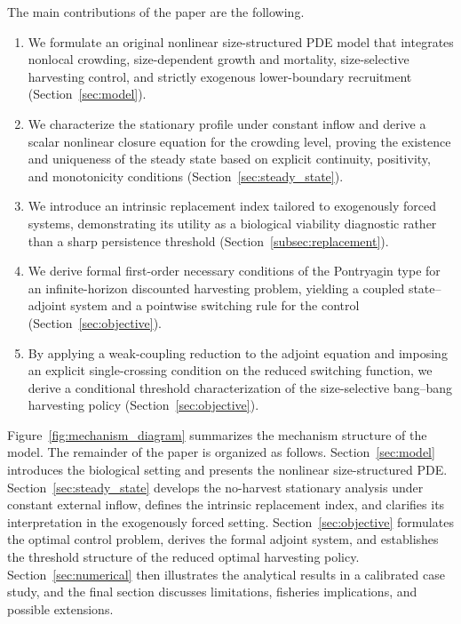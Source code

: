 \documentclass[pdflatex,sn-mathphys-num]{sn-jnl}
\theoremstyle{thmstyleone}
\theoremstyle{definition}
\theoremstyle{remark}
\begin{document}
The main contributions of the paper are the following.
\begin{enumerate}[label=(\roman*)]

\item We formulate an original nonlinear size-structured PDE model that integrates nonlocal crowding, size-dependent growth and mortality, size-selective harvesting control, and strictly exogenous lower-boundary recruitment (Section~\ref{sec:model}).

\item We characterize the stationary profile under constant inflow and derive a scalar nonlinear closure equation for the crowding level, proving the existence and uniqueness of the steady state based on explicit continuity, positivity, and monotonicity conditions (Section~\ref{sec:steady_state}).

\item We introduce an intrinsic replacement index tailored to exogenously forced systems, demonstrating its utility as a biological viability diagnostic rather than a sharp persistence threshold (Section~\ref{subsec:replacement}).

\item We derive formal first-order necessary conditions of the Pontryagin type for an infinite-horizon discounted harvesting problem, yielding a coupled state–adjoint system and a pointwise switching rule for the control (Section~\ref{sec:objective}).

\item By applying a weak-coupling reduction to the adjoint equation and imposing an explicit single-crossing condition on the reduced switching function, we derive a conditional threshold characterization of the size-selective bang--bang harvesting policy (Section~\ref{sec:objective}).

\end{enumerate}

Figure~\ref{fig:mechanism_diagram} summarizes the mechanism structure of the model. The remainder of the paper is organized as follows. 
Section~\ref{sec:model} introduces the biological setting and presents the nonlinear size-structured PDE. 
Section~\ref{sec:steady_state} develops the no-harvest stationary analysis under constant external inflow, defines the intrinsic replacement index, and clarifies its interpretation in the exogenously forced setting. 
Section~\ref{sec:objective} formulates the optimal control problem,
derives the formal adjoint system, and establishes the threshold structure of the reduced optimal harvesting policy. 
Section~\ref{sec:numerical} then illustrates the analytical results in a calibrated case study, and the final section discusses limitations, fisheries implications, and possible extensions.
\end{document}
